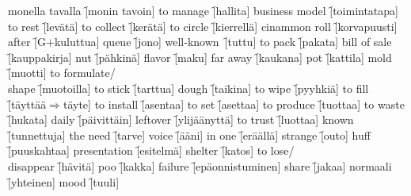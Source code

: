 \begin{questions}
\begin{multicols}{3}
    \question monella tavalla \f[monin tavoin]
    \question to manage \f[hallita]
    \question business model \f[toimintatapa]
    \question to rest \f[levätä]
    \question to collect \f[kerätä]
    \question to circle \f[kierrellä]
    \question cinammon roll \f[korvapuusti]
    \question after \f[G$+$kuluttua]
    \question queue \f[jono]
    \question well-known \f[tuttu]
    \question to pack \f[pakata]
    \question bill of sale \f[kauppakirja]
    \question nut \f[pähkinä]
    \question flavor \f[maku]
    \question far away \f[kaukana]
    \question pot \f[kattila]
    \question mold \f[muotti]
    \question to formulate/\\shape \f[muotoilla]
    \question to stick \f[tarttua]
    \question dough \f[taikina]
    \question to wipe \f[pyyhkiä]
    \question to fill \f[täyttää$\Rightarrow$täyte]
    \question to install \f[asentaa]
    \question to set \f[asettaa]
    \question to produce \f[tuottaa]
    \question to waste \f[hukata] %
    \question daily \f[päivittäin]
    \question leftover \f[ylijäänyttä]
    \question to trust \f[luottaa]
    \question known \f[tunnettuja]
    \question the need \f[tarve]
    \question voice \f[ääni]
    \question in one \f[eräällä]
    \question strange \f[outo]
    \question huff \f[puuskahtaa]
    \question presentation \f[esitelmä] %
    \question shelter \f[katos]
    \question to lose/\\disappear \f[hävitä]
    \question poo \f[kakka]
    \question failure \f[epäonnistuminen]
    \question share \f[jakaa]
    \question normaali \f[yhteinen]
    \question mood \f[tuuli] %
  \end{multicols}
\end{questions}
